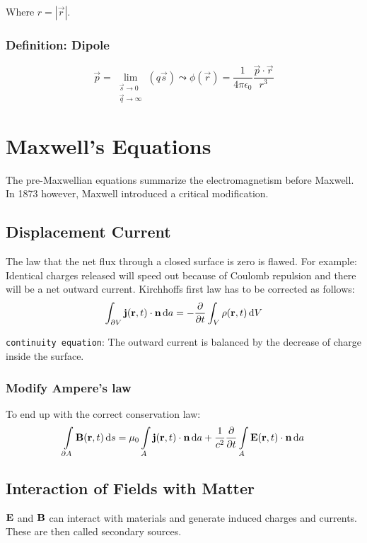 \documentclass[a4paper, fontsize=8pt, landscape, DIV=1]{scrartcl}
\begin{document}
\begin{multicols*}{4}
  Where $r = |\vec{r}|$.

  \subsubsection{Definition: Dipole}
  \[\vec{p}=\lim_{\substack{\vec{s}\to 0 \\ \vec{q}\to \infty}}(q\vec{s}) \leadsto \phi(\vec{r})=\frac{1}{4\pi\epsilon_0}\frac{\vec{p}\cdot\vec{r}}{r^3}\]


  \section{Maxwell's Equations}
  The pre-Maxwellian equations summarize the electromagnetism before Maxwell. In 1873 however, Maxwell introduced a critical modification.

  \subsection{Displacement Current}
  The law that the net flux through a closed surface is zero is flawed. For example: Identical charges released will speed out because of Coulomb repulsion and there will be a net outward current. Kirchhoffs first law has to be corrected as follows:
  \[\int_{\partial V} \mathbf{j}(\mathbf{r},t) \cdot \mathbf{n} \,\mathrm{d} a = -\frac{\partial}{\partial t} \int_V  \rho(\mathbf{r},t) \,\mathrm{d} V\]

  \texttt{continuity equation}: The outward current is balanced by the decrease of charge inside the surface.

  \subsubsection{Modify Ampere's law}
  To end up with the correct conservation law:
  \[\int\displaylimits_{\partial A}\mathbf{B}(\mathbf{r},t)\,\mathrm{d} s = \mu_0\int\displaylimits_A\mathbf{j}(\mathbf{r},t)\cdot \mathbf{n} \,\mathrm{d} a + \frac{1}{c^2}\frac{\partial}{\partial t}\int\displaylimits_A \mathbf{E}(\mathbf{r},t)\cdot \mathbf{n}\,\mathrm{d} a\]

  \subsection{Interaction of Fields with Matter}
  $\mathbf{E}$ and $\mathbf{B}$ can interact with materials and generate induced charges and currents. These are then called secondary sources.


\end{multicols*}
\end{document}
